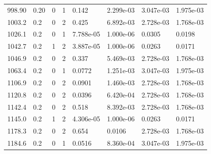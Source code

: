 \documentclass[preview]{standalone}
\begin{document}
{{{\begin{tabular}{L{1.2cm}C{1.2cm} C{0.3cm}C{0.5cm} C{1.4cm}C{1.4cm} C{1.4cm}C{1.4cm}}
  998.90  &  0.20  & 0     &  1 &  0.142  & 2.299e-03  & 3.047e-03 &  1.975e-03   \\ 
  1003.2  &   0.2  & 0     &  2 &  0.425  & 6.892e-03  & 2.728e-03 &  1.768e-03   \\ 
  1026.1  &   0.2  & 0     &  1 &  7.788e-05  & 1.000e-06  & 0.0305 &  0.0198   \\ 
  1042.7  &   0.2  & 1     &  2 &  3.887e-05  & 1.000e-06  & 0.0263 &  0.0171   \\ 
  1046.9  &   0.2  & 0     &  2 &  0.337  & 5.469e-03  & 2.728e-03 &  1.768e-03   \\ 
  1063.4  &   0.2  & 0     &  1 &  0.0772  & 1.251e-03  & 3.047e-03 &  1.975e-03   \\ 
  1106.9  &   0.2  & 0     &  2 &  0.0901  & 1.460e-03  & 2.728e-03 &  1.768e-03   \\ 
  1120.8  &   0.2  & 0     &  2 &  0.0396  & 6.420e-04  & 2.728e-03 &  1.768e-03   \\ 
  1142.4  &   0.2  & 0     &  2 &  0.518  & 8.392e-03  & 2.728e-03 &  1.768e-03   \\ 
  1145.0  &   0.2  & 1     &  2 &  4.306e-05  & 1.000e-06  & 0.0263 &  0.0171   \\ 
  1178.3  &   0.2  & 0     &  2 &  0.654  & 0.0106  & 2.728e-03 &  1.768e-03   \\ 
  1184.6  &   0.2  & 0     &  1 &  0.0516  & 8.360e-04  & 3.047e-03 &  1.975e-03   \\ 
\hline 
\end{tabular} 

}}}
\end{document}
